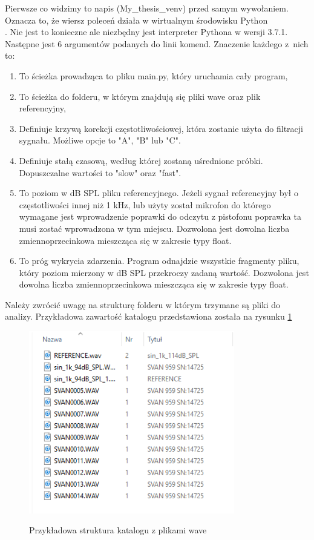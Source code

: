 \documentclass[eng,printmode]{mgr}
\begin{document}
Pierwsze co widzimy to napis (My\_thesis\_venv) przed samym wywołaniem. Oznacza to, że wiersz poleceń działa w wirtualnym środowisku Python \\ \cite{venv}. Nie jest to konieczne ale niezbędny jest interpreter Pythona w wersji 3.7.1. Następne jest 6 argumentów podanych do linii komend. Znaczenie każdego z~nich to:

\begin{minipage}{\linewidth}
\begin{enumerate}
\item To ścieżka prowadząca to pliku main.py, który uruchamia cały program,
\item To ścieżka do folderu, w którym znajdują się pliki wave oraz plik referencyjny,
\item Definiuje krzywą korekcji częstotliwościowej, która zostanie użyta do filtracji sygnału. Możliwe opcje to "A", "B" lub "C".
\item Definiuje stałą czasową, według której zostaną uśrednione próbki. Dopuszczalne wartości to "slow" oraz "fast".
\item To poziom w dB SPL pliku referencyjnego. Jeżeli sygnał referencyjny był o częstotliwości innej niż 1 kHz, lub użyty został mikrofon do którego wymagane jest wprowadzenie poprawki do odczytu z pistofonu poprawka ta musi zostać wprowadzona w tym miejscu. Dozwolona jest dowolna liczba zmiennoprzecinkowa mieszcząca się w zakresie typy float.
\item To próg wykrycia zdarzenia. Program odnajdzie wszystkie fragmenty pliku, który poziom mierzony w dB SPL przekroczy zadaną wartość. Dozwolona jest dowolna liczba zmiennoprzecinkowa mieszcząca się w zakresie typy float.
\end{enumerate}
\end{minipage}   

Należy zwrócić uwagę na strukturę folderu w którym trzymane są pliki do analizy. Przykładowa zawartość katalogu przedstawiona została na rysunku \ref{katalog}

\begin{figure}[hbtp]
\caption{Przykładowa struktura katalogu z plikami wave}
\centering
\includegraphics[width=0.8\textwidth]{katalog_przyklad.PNG}
\label{katalog}
\end{figure}
\end{document}
